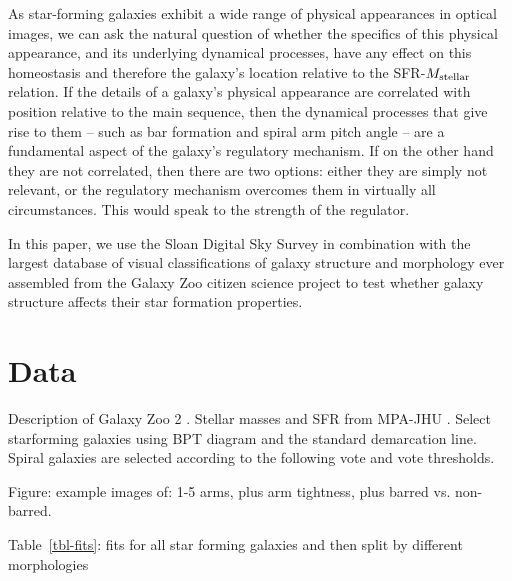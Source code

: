 \documentclass{emulateapj}
\begin{document}
As star-forming galaxies exhibit a wide range of physical appearances in optical images, we can ask the natural question of whether the specifics of this physical appearance, and its underlying dynamical processes, have any effect on this homeostasis and therefore the galaxy's location relative to the SFR-$M_{\rm stellar}$ relation. If the details of a galaxy's physical appearance are correlated with position relative to the main sequence, then the dynamical processes that give rise to them -- such as bar formation and spiral arm pitch angle -- are a fundamental aspect of the galaxy's regulatory mechanism. If on the other hand they are not correlated, then there are two options: either they are simply not relevant, or the regulatory mechanism overcomes them in virtually all circumstances. This would speak to the strength of the regulator.

In this paper, we use the Sloan Digital Sky Survey \citep{yor00,str02,aba09} in combination with the largest database of visual classifications of galaxy structure and morphology ever assembled from the Galaxy Zoo citizen science project \citep{lin08,lin11,wil13} to test whether galaxy structure affects their star formation properties.





\section{Data} \label{sec-data}

Description of Galaxy Zoo 2 \citep{wil13}. Stellar masses and SFR from MPA-JHU \citep{kau03a,bri04}. Select starforming galaxies using BPT diagram \citep{bal81} and the standard \citet{kau03} demarcation line. Spiral galaxies are selected according to the following vote and vote thresholds. 

Figure: example images of: 1-5 arms, plus arm tightness, plus barred vs. non-barred. 

Table~\ref{tbl-fits}: fits for all star forming galaxies and then split by different morphologies
\end{document}
